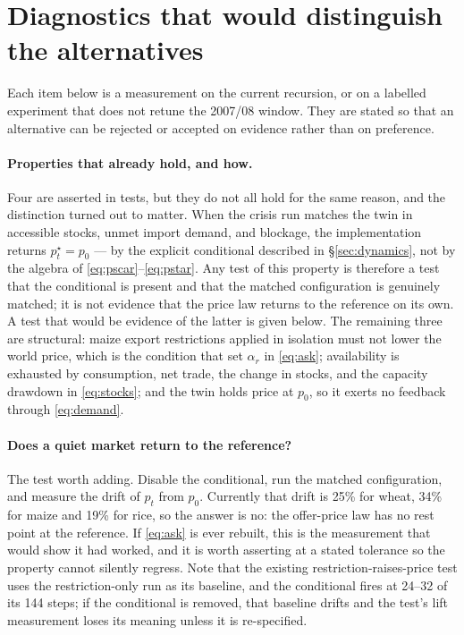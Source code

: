 \section{Diagnostics that would distinguish the alternatives}
\label{sec:diagnostics}

Each item below is a measurement on the current recursion, or on a
labelled experiment that does not retune the 2007/08 window. They are
stated so that an alternative can be rejected or accepted on evidence
rather than on preference.

\paragraph{Properties that already hold, and how.}
Four are asserted in tests, but they do not all hold for the same reason,
and the distinction turned out to matter. When the crisis run matches the
twin in accessible stocks, unmet import demand, and blockage, the
implementation returns \(p^\star_t=p_0\) --- by the explicit conditional
described in \S\ref{sec:dynamics}, not by the algebra of
\eqref{eq:pscar}--\eqref{eq:pstar}. Any test of this property is therefore
a test that the conditional is present and that the matched configuration
is genuinely matched; it is not evidence that the price law returns to the
reference on its own. A test that would be evidence of the latter is given
below. The remaining three are structural: maize export restrictions
applied in isolation must not lower the world price, which is the condition
that set \(\alpha_r\) in \eqref{eq:ask}; availability is exhausted by
consumption, net trade, the change in stocks, and the capacity drawdown in
\eqref{eq:stocks}; and the twin holds price at \(p_0\), so it exerts no
feedback through \eqref{eq:demand}.

\paragraph{Does a quiet market return to the reference?}
The test worth adding. Disable the conditional, run the matched
configuration, and measure the drift of \(p_t\) from \(p_0\). Currently
that drift is 25\% for wheat, 34\% for maize and 19\% for rice, so the
answer is no: the offer-price law has no rest point at the reference. If
\eqref{eq:ask} is ever rebuilt, this is the measurement that would show it
had worked, and it is worth asserting at a stated tolerance so the property
cannot silently regress. Note that the existing restriction-raises-price
test uses the restriction-only run as its baseline, and the conditional
fires at 24--32 of its 144 steps; if the conditional is removed, that
baseline drifts and the test's lift measurement loses its meaning unless it
is re-specified.

